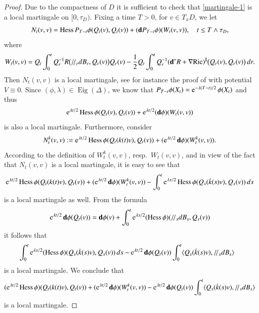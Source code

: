 \documentclass[11pt,reqno]{amsart}
\theoremstyle{definition} \newtheorem{remark}[theorem]{Remark}
\numberwithin{equation}{section}
\def\Ric{{\operatorname{Ric}}} \def\Hess{\operatorname{Hess}}
\newcommand\1{\mathbbm{1}}
\def\Ric{{\operatorname{Ric}}} \def\Aut{{\operatorname{Aut}}}
\def\Eig{\operatorname{Eig}} \def\II{{\operatorname{II}}}
\def\bd{{\bf d}}
\newcommand{\ptr}{/\!/}
\def\II{{\operatorname{II}}}
\begin{document}
\begin{proof} Due to the compactness of $D$ it is sufficient to check that
\eqref{martingale-1} is a local martingale on $[0,\tau_D)$.
  Fixing a time $T>0$, for $v\in T_xD$, we let 
  \begin{align*}
    N_t(v,v)= \Hess P_{T-t}\phi(Q_t(v), Q_t(v))+(\bd P_{T-t} \phi)(W_t(v,v)),\quad
              t\leq T\wedge\tau_D,
  \end{align*}
where 
\begin{align*}
  W_{t}(v,v)=Q_t\int_0^tQ_{r}^{-1}R\big(\ptr_{r} d B_r, Q_{r}(v)\big)Q_{r}(v)-\frac12 Q_t\int_0^t Q_{r}^{-1}(\bd^* R+\nabla \Ric)^{\sharp}\big(Q_{r}(v), Q_{r}(v)\big)\, d r.
\end{align*}
  Then $N_t(v,v)$ is a local martingale, see for instance the proof of
  \cite[Lemma 2.7]{Thompson2019} with potential $V\equiv 0$.
  Since $(\phi,\lambda)\in \Eig(\Delta)$, we know that
  $P_{T-t}\phi(X_t)=\operatorname{e}^{-\lambda(T-t)/2}\phi(X_t)$ and thus 
  $$\e^{\lambda t/2}\Hess \phi(Q_t(v), Q_t(v))+\e^{\lambda t/2}(\bd \phi)(W_t(v,v))$$
is also a local martingale.
Furthermore, consider
$$N^k_t(v,v):=\e^{\lambda t/2} \Hess \phi(Q_t(k(t)v), Q_t(v))+(\e^{\lambda t/2} \bd \phi)(W^k_t(v,v)).$$ 
According to the definition of $W^k_t(v,v)$, resp.~$W_t(v,v)$, and in
view of the fact that $N_t(v,v)$ is a local martingale, it is easy to
see that
\begin{align*}
  \e^{\lambda t/2} \Hess \phi(Q_t(k(t)v), Q_t(v))+(\e^{\lambda t/2} \bd\phi)(W^k_t(v,v))-\int_0^t \e^{\lambda s/2}\Hess \phi(Q_s(\dot{k}(s)
              v), Q_s(v))\,ds
\end{align*}
is a local martingale as well. From the formula
\begin{align*}
  \e^{\lambda t/2} \bd \phi(Q_t(v))=\bd \phi(v)+\int_0^t \e^{\lambda s/2}(\Hess \phi)
  (\ptr_sd  B_s, Q_s(v))
\end{align*}
it follows that
\begin{align}\label{local-M3a}
  &\int_0^t \e^{\lambda s/2}(\Hess \phi)(Q_s(\dot{k}(s)v), Q_s(v))
    \,ds-\e^{\lambda t/2} \bd \phi(Q_t(v))\int_0^t\langle Q_s(\dot{k}(s)v),
    \ptr_sd  B_s\rangle
\end{align}
is a local martingale. We conclude that
\begin{align*}
 (\e^{\lambda t/2} \Hess \phi)(Q_t(k(t)v), Q_t(v))+(\e^{\lambda t/2} \bd \phi)(W^k_t(v,v))-
 \e^{\lambda t/2} \bd \phi(Q_t(v))\int_0^t\langle Q_s(\dot{k}(s)v),
   \ptr_sd  B_s\rangle
\end{align*}
is a local martingale.
\end{proof}
\end{document}
